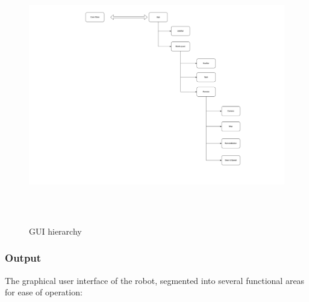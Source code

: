 \documentclass[../../main]{subfiles}
\begin{document}
\begin{figure}[h!]
    \centering
    \includegraphics[width=6.26806in,height=4.42986in]{img/image001.png}
    \caption{GUI hierarchy}
    \label{judFig1}
    \end{figure}
    
    \subsubsection{Output}
    The graphical user interface of the robot, segmented into several
    functional areas for ease of operation:
    
\end{document}
